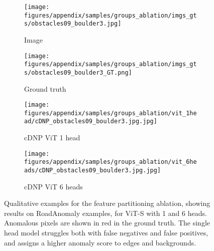 \documentclass[10pt,twocolumn,letterpaper]{article}
\begin{document}
\begin{figure}[h!]
    \begin{subfigure}[b]{0.110\textwidth}
        \centering
        \texttt{[image: figures/appendix/samples/groups\_ablation/imgs\_gts/obstacles09\_boulder3.jpg]}
        \caption*{\tiny Image}
    \end{subfigure}
    \begin{subfigure}[b]{0.110\textwidth}
        \centering
        \texttt{[image: figures/appendix/samples/groups\_ablation/imgs\_gts/obstacles09\_boulder3\_GT.png]}
        \caption*{\tiny Ground truth}
    \end{subfigure}
    \begin{subfigure}[b]{0.110\textwidth}
        \centering
        \texttt{[image: figures/appendix/samples/groups\_ablation/vit\_1head/cDNP\_obstacles09\_boulder3.jpg.jpg]}
        \caption*{\tiny cDNP ViT 1 head}
    \end{subfigure}
    \begin{subfigure}[b]{0.110\textwidth}
        \centering
        \texttt{[image: figures/appendix/samples/groups\_ablation/vit\_6heads/cDNP\_obstacles09\_boulder3.jpg.jpg]}
        \caption*{\tiny cDNP ViT 6 heads}
    \end{subfigure}
    
    \caption{Qualitative examples for the feature partitioning ablation, showing results on RoadAnomaly examples, for ViT-S with 1 and 6 heads. Anomalous pixels are shown in red in the ground truth. The single head model struggles both with false negatives and false positives, and assigns a higher anomaly score to edges and backgrounds.}
    
    \label{fig:ablation_quali}
\end{figure} 
\end{document}
